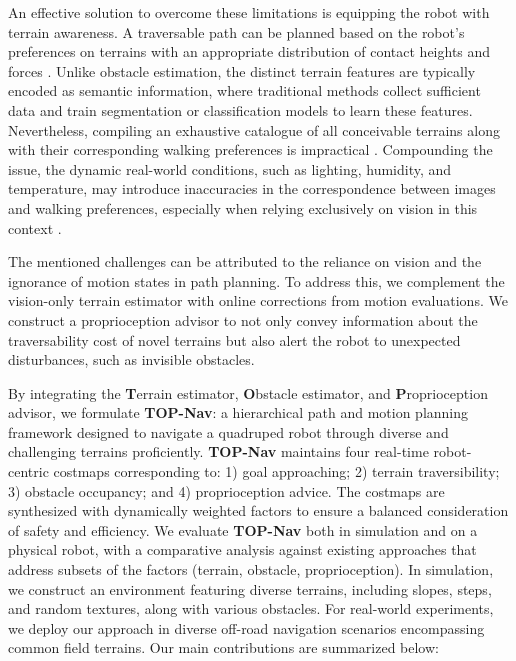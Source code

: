 \documentclass[conference]{IEEEtran}
\begin{document}
An effective solution to overcome these limitations is equipping the robot with terrain awareness. A traversable path can be planned based on the robot's preferences on terrains \cite{ewen2022these,gan2022multitask} with an appropriate distribution of contact heights and forces \cite{erni2023mem}. Unlike obstacle estimation, the distinct terrain features are typically encoded as semantic information, where traditional methods collect sufficient data and train segmentation or classification models \cite{guan2022ga} to learn these features. Nevertheless, compiling an exhaustive catalogue of all conceivable terrains along with their corresponding walking preferences is impractical \cite{frey2023fast}. Compounding the issue, the dynamic real-world conditions, such as lighting, humidity, and temperature, may introduce inaccuracies in the correspondence between images and walking preferences, especially when relying exclusively on vision in this context \cite{yao2022rca}.


The mentioned challenges can be attributed to the reliance on vision and the ignorance of motion states in path planning. To address this, we complement the vision-only terrain estimator with online corrections from  motion evaluations. We construct a proprioception advisor to not only convey information about the traversability cost of novel terrains but also alert the robot to unexpected disturbances, such as invisible obstacles.

By integrating the \textbf{T}errain estimator, \textbf{O}bstacle estimator, and \textbf{P}roprioception advisor, we formulate \textbf{TOP-Nav}: a hierarchical path and motion planning framework designed to navigate a quadruped robot through diverse and challenging terrains proficiently. \textbf{TOP-Nav} maintains four real-time robot-centric costmaps corresponding to: 1) goal approaching; 2) terrain traversibility; 3) obstacle occupancy; and 4) proprioception advice. The costmaps are synthesized with dynamically weighted factors to ensure a balanced consideration of safety and efficiency. We evaluate \textbf{TOP-Nav} both in simulation and on a physical robot, with a comparative analysis against existing approaches that address subsets of the factors (terrain, obstacle, proprioception). In simulation, we construct an environment featuring diverse terrains, including slopes, steps, and random textures, along with various obstacles. For real-world experiments, we deploy our approach in diverse off-road navigation scenarios encompassing common field terrains. Our main contributions are summarized below:
\end{document}
